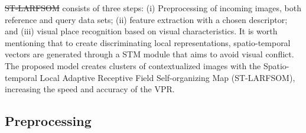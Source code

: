 \documentclass[letterpaper, 10 pt, conference]{ieeeconf}  %
\providecommand{\DIFaddtex}[1]{{\protect\color{blue}\uwave{#1}}} %
\providecommand{\DIFdeltex}[1]{{\protect\color{red}\sout{#1}}}                      %
\providecommand{\DIFaddbegin}{} %
\providecommand{\DIFaddend}{} %
\providecommand{\DIFdelbegin}{} %
\providecommand{\DIFdelend}{} %
\providecommand{\DIFadd}[1]{\texorpdfstring{\DIFaddtex{#1}}{#1}} %
\providecommand{\DIFdel}[1]{\texorpdfstring{\DIFdeltex{#1}}{}} %
\newcommand{\DIFscaledelfig}{0.5}
\newlength{\DIFdelgraphicswidth} %
\newlength{\DIFdelgraphicsheight} %
\newcommand{\DIFaddincludegraphics}[2][]{{\color{blue}\fbox{\DIFOincludegraphics[#1]{#2}}}} %
\newcommand{\DIFdelincludegraphics}[2][]{%
\sbox{\DIFdelgraphicsbox}{\DIFOincludegraphics[#1]{#2}}%
\settoboxwidth{\DIFdelgraphicswidth}{\DIFdelgraphicsbox} %
\settoboxtotalheight{\DIFdelgraphicsheight}{\DIFdelgraphicsbox} %
\scalebox{\DIFscaledelfig}{%
\parbox[b]{\DIFdelgraphicswidth}{\usebox{\DIFdelgraphicsbox}\\[-\baselineskip] \rule{\DIFdelgraphicswidth}{0em}}\llap{\resizebox{\DIFdelgraphicswidth}{\DIFdelgraphicsheight}{%
\setlength{\unitlength}{\DIFdelgraphicswidth}%
\begin{picture}(1,1)%
\thicklines\linethickness{2pt} %
{\color[rgb]{1,0,0}\put(0,0){\framebox(1,1){}}}%
{\color[rgb]{1,0,0}\put(0,0){\line( 1,1){1}}}%
{\color[rgb]{1,0,0}\put(0,1){\line(1,-1){1}}}%
\end{picture}%
}\hspace*{3pt}}} %
} %
\DeclareRobustCommand{\DIFaddbegin}{\DIFOaddbegin \let\includegraphics\DIFaddincludegraphics} %
\DeclareRobustCommand{\DIFaddend}{\DIFOaddend \let\includegraphics\DIFOincludegraphics} %
\DeclareRobustCommand{\DIFdelbegin}{\DIFOdelbegin \let\includegraphics\DIFdelincludegraphics} %
\DeclareRobustCommand{\DIFdelend}{\DIFOaddend \let\includegraphics\DIFOincludegraphics} %
\begin{document}
\DIFdelbegin \DIFdel{ST-LARFSOM }\DIFdelend \DIFaddbegin \DIFadd{STS-VPR }\DIFaddend consists of three steps: (i) Preprocessing of incoming images, both
reference and query data sets; (ii) feature extraction with a chosen descriptor; and (iii)
visual place recognition based on visual characteristics. It is worth mentioning that to
create discriminating local representations, spatio-temporal vectors are generated
through a STM module that aims to avoid visual conflict. The proposed model creates clusters of contextualized images with the Spatio-temporal Local Adaptive Receptive Field Self-organizing Map (ST-LARFSOM), increasing the speed and accuracy of the VPR.





\subsection{Preprocessing}\label{sub:preprocessing}
\end{document}
